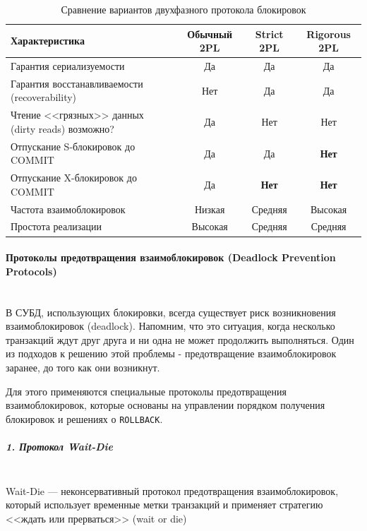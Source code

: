  \begin{table}[H]
     \centering
     \begin{tabular}{|l|c|c|c|}
         \hline
         \textbf{Характеристика} & \textbf{Обычный 2PL} & \textbf{Strict 2PL} & \textbf{Rigorous 2PL} \\
         \hline
         Гарантия сериализуемости & Да & Да & Да \\
         \hline
         Гарантия восстанавливаемости (recoverability) & Нет & Да & Да \\
         \hline
         Чтение <<грязных>> данных (dirty reads) возможно? & Да & Нет & Нет \\
         \hline
         Отпускание S-блокировок до COMMIT & Да & Да & \textbf{Нет} \\
         \hline
         Отпускание X-блокировок до COMMIT & Да & \textbf{Нет} & \textbf{Нет} \\
         \hline
         Частота взаимоблокировок & Низкая & Средняя & Высокая \\
         \hline
         Простота реализации & Высокая & Средняя & Средняя \\
         \hline
     \end{tabular}
     \caption{Сравнение вариантов двухфазного протокола блокировок}
 \end{table}
 
 \paragraph{Протоколы предотвращения взаимоблокировок (Deadlock Prevention Protocols)} ~\\
 
 В СУБД, использующих блокировки, всегда существует риск возникновения взаимоблокировок (deadlock). Напомним, что это ситуация, когда несколько транзакций ждут друг друга и ни одна не может продолжить выполняться. Один из подходов к решению этой проблемы - предотвращение взаимоблокировок заранее, до того как они возникнут.
 
 Для этого применяются специальные протоколы предотвращения взаимоблокировок, которые основаны на управлении порядком получения блокировок и решениях о \texttt{ROLLBACK}. \autocite{Silberschatz, ElmasriNavathe}
 
 \subparagraph{1. Протокол Wait-Die} ~\\

 Wait-Die — неконсервативный протокол предотвращения взаимоблокировок, который использует временные метки транзакций и применяет стратегию <<ждать или прерваться>> (wait or die)
 
